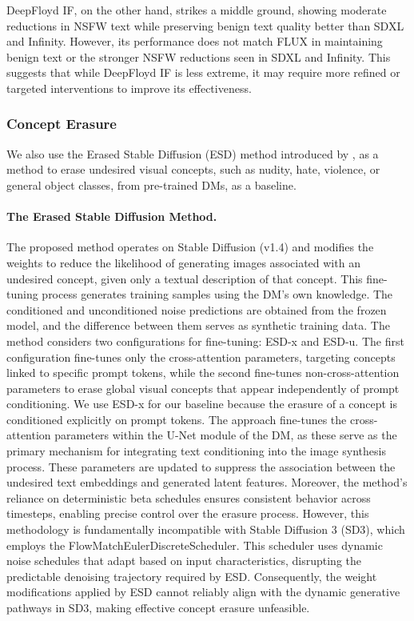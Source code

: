 DeepFloyd IF, on the other hand, strikes a middle ground, showing moderate reductions in NSFW text while preserving benign text quality better than SDXL and Infinity. However, its performance does not match FLUX in maintaining benign text or the stronger NSFW reductions seen in SDXL and Infinity. This suggests that while DeepFloyd IF is less extreme, it may require more refined or targeted interventions to improve its effectiveness.

\subsubsection{Concept Erasure}
\label{app:esd}

We also use the Erased Stable Diffusion (ESD) method introduced by  \citet{gandikota2023erasing}, as a method to erase undesired visual concepts, such as nudity, hate, violence, or general object classes, from pre-trained DMs, as a baseline.

\paragraph{The Erased Stable Diffusion Method.}

 
The proposed method operates on Stable Diffusion (v1.4) and modifies the weights to reduce the likelihood of generating images associated with an undesired concept, given only a textual description of that concept. This fine-tuning process generates training samples using the DM's own knowledge. The conditioned and unconditioned noise predictions are obtained from the frozen model, and the difference between them serves as synthetic training data. The method considers two configurations for fine-tuning: ESD-x and ESD-u. The first configuration fine-tunes only the cross-attention parameters, targeting concepts linked to specific prompt tokens, while the second fine-tunes non-cross-attention parameters to erase global visual concepts that appear independently of prompt conditioning. We use ESD-x for our baseline because the erasure of a concept is conditioned explicitly on prompt tokens. The approach fine-tunes the cross-attention parameters within the U-Net module of the DM, as these serve as the primary mechanism for integrating text conditioning into the image synthesis process. These parameters are updated to suppress the association between the undesired text embeddings and generated latent features. Moreover, the method's reliance on deterministic beta schedules ensures consistent behavior across timesteps, enabling precise control over the erasure process. However, this methodology is fundamentally incompatible with Stable Diffusion 3 (SD3), which employs the FlowMatchEulerDiscreteScheduler. This scheduler uses dynamic noise schedules that adapt based on input characteristics, disrupting the predictable denoising trajectory required by ESD. Consequently, the weight modifications applied by ESD cannot reliably align with the dynamic generative pathways in SD3, making effective concept erasure unfeasible.

